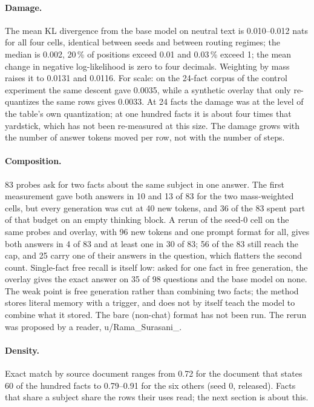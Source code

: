 \documentclass[10pt,a4paper]{article}
\begin{document}
\paragraph{Damage.} The mean KL divergence from the base model on neutral text is
0.010--0.012 nats for all four cells, identical between seeds and between routing
regimes; the median is 0.002, 20\,\% of positions exceed 0.01 and 0.03\,\% exceed 1; the
mean change in negative log-likelihood is zero to four decimals. Weighting by mass raises
it to 0.0131 and 0.0116. For scale: on the 24-fact corpus of the control experiment the same
descent gave 0.0035, while a synthetic overlay that only re-quantizes the same rows gives
0.0033. At 24 facts the damage was at the level of the table's own quantization; at one
hundred facts it is about four times that yardstick, which has not been re-measured at this
size.
The damage grows with the number of answer tokens moved per row, not with the number of
steps.

\paragraph{Composition.} 83 probes ask for two facts about the same subject in one
answer. The first measurement gave both answers in 10 and 13 of 83 for the two mass-weighted
cells, but every generation was cut at 40 new tokens, and 36 of the 83 spent part of that
budget on an empty thinking block. A rerun of the seed-0 cell on the same probes and overlay,
with 96 new tokens and one prompt format for all, gives both answers in 4 of 83 and at least
one in 30 of 83; 56 of the 83 still reach the cap, and 25 carry one of their answers in the
question, which flatters the second count. Single-fact free recall is itself low: asked for
one fact in free generation, the overlay gives the exact answer on 35 of 98 questions and the
base model on none. The weak point is free
generation rather than combining two facts; the method stores literal memory with a trigger,
and does not by itself teach the model to combine what it stored. The bare (non-chat) format
has not been run. The rerun was proposed by a reader, u/Rama\_Surasani\_.

\paragraph{Density.} Exact match by source document ranges from 0.72 for the document
that states 60 of the hundred facts to 0.79--0.91 for the six others (seed 0, released).
Facts that share a subject share the rows their uses read; the next section is about
this.
\end{document}
